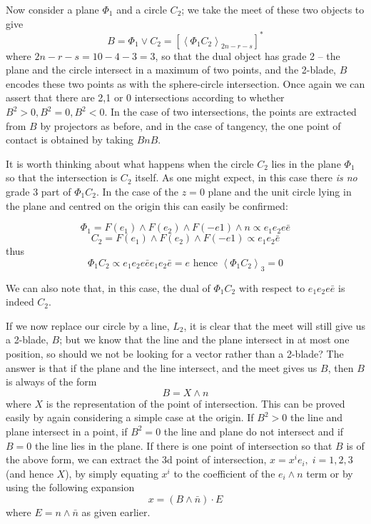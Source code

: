 Now consider a plane $\Phi_1$ and a circle $C_2$; we take
the meet of these two objects to give
%
\begin{equation}
B = \Phi_1 \vee C_2 = \left[\left< \Phi_1 C_2
\right>_{2n-r-s}\right]^*
\end{equation}
%
where $2n-r-s=10-4-3=3$, so that the dual object has
grade 2 -- the plane and the circle intersect in a
maximum of two points, and the 2-blade, $B$ encodes these
two points as with the sphere-circle intersection. Once
again we can assert that there are 2,1 or 0 intersections
according to whether $B^2>0,B^2=0,B^2<0$. In the case of
two intersections, the points are extracted from $B$ by
projectors as before, and in the case of tangency, the
one point of contact is obtained by taking $BnB$.

It is worth thinking about what happens when the circle
$C_2$ lies in the plane $\Phi_1$ so that the intersection is
$C_2$ itself. As one might expect, in this case there \emph{is
no} grade 3 part of $\Phi_1C_2$. In the case of the $z=0$ plane and
the unit circle lying in the plane and centred on the origin this can
easily be confirmed:

\[
\Phi_1 = F(e_1) \wedge F(e_2) \wedge F(-e1) \wedge n \propto e_1e_2e\bar{e}
\]
\[
C_2 = F(e_1) \wedge F(e_2) \wedge F(-e1) \propto e_1e_2\bar{e}
\]
thus
\[
\Phi_1C_2 \propto e_1e_2e\bar{e}e_1e_2\bar{e} = e \mbox{ hence }
\left<\Phi_1C_2\right>_3 = 0
\]

We can also note that, in this case, the dual of $\Phi_1C_2$ with respect to
$e_1e_2e\bar{e}$ is indeed $C_2$.

If we now replace our circle by a line, $L_2$, it is
clear that the meet will still give us a 2-blade, $B$;
but we know that the line and the plane intersect in at
most one position, so should we not be looking for a
vector rather than a 2-blade? The answer is that if the
plane and the line intersect, and the meet gives us $B$,
then $B$ is always of the form
%
\[  B = X\wedge n  \]
%
where $X$ is the representation of the point of intersection. This can be
proved easily by again considering a simple case at the
origin. If $B^2>0$ the line and plane intersect in a
point, if $B^2=0$ the line and plane do not intersect and
if $B=0$ the line lies in the plane. If there is one
point of intersection so that $B$ is of the above form,
we can extract the 3d point of intersection,
$x=x^ie_i,\;i=1,2,3$ (and hence $X$), by simply equating
$x^i$ to the coefficient of the $e_i\wedge n$ term or by
using the following expansion
%
\begin{equation}
 x = (B\wedge \bar{n})\cdot E
 \end{equation}
%
where $E=n\wedge \bar{n}$ as given earlier.


